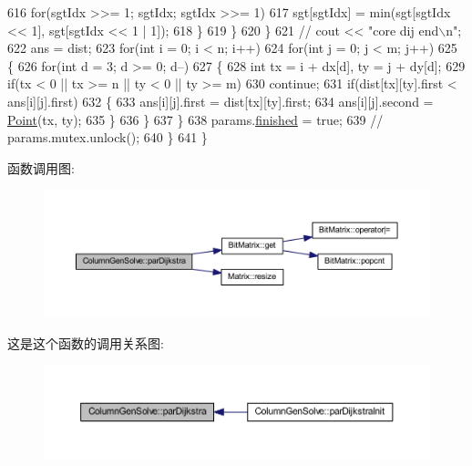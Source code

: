 \begin{DoxyCode}
616                     \textcolor{keywordflow}{for}(sgtIdx >>= 1; sgtIdx; sgtIdx >>= 1)
617                         sgt[sgtIdx] = min(sgt[sgtIdx << 1], sgt[sgtIdx << 1 | 1]);
618                 \}
619             \}
620         \}
621         \textcolor{comment}{// cout << "core dij end\(\backslash\)n";}
622         ans = dist;
623         \textcolor{keywordflow}{for}(\textcolor{keywordtype}{int} i = 0; i < n; i++)
624             \textcolor{keywordflow}{for}(\textcolor{keywordtype}{int} j = 0; j < m; j++)
625             \{
626                 \textcolor{keywordflow}{for}(\textcolor{keywordtype}{int} d = 3; d >= 0; d--)
627                 \{
628                     \textcolor{keywordtype}{int} tx = i + dx[d], ty = j + dy[d];
629                     \textcolor{keywordflow}{if}(tx < 0 || tx >= n || ty < 0 || ty >= m)
630                         \textcolor{keywordflow}{continue};
631                     \textcolor{keywordflow}{if}(dist[tx][ty].first < ans[i][j].first)
632                     \{
633                         ans[i][j].first = dist[tx][ty].first;
634                         ans[i][j].second = \hyperlink{classPoint}{Point}(tx, ty);
635                     \}
636                 \}
637             \}
638         params.\hyperlink{structColumnGenSolve_1_1parDijkstraParams_a72bfc9f9b0c4851bdb63715b053df511}{finished} = \textcolor{keyword}{true};
639         \textcolor{comment}{// params.mutex.unlock();}
640     \}
641 \}
\end{DoxyCode}


函数调用图\+:
\nopagebreak
\begin{figure}[H]
\begin{center}
\leavevmode
\includegraphics[width=350pt]{classColumnGenSolve_a6dc294df38e9aa3160f435bd527f2f20_cgraph}
\end{center}
\end{figure}




这是这个函数的调用关系图\+:
\nopagebreak
\begin{figure}[H]
\begin{center}
\leavevmode
\includegraphics[width=350pt]{classColumnGenSolve_a6dc294df38e9aa3160f435bd527f2f20_icgraph}
\end{center}
\end{figure}


